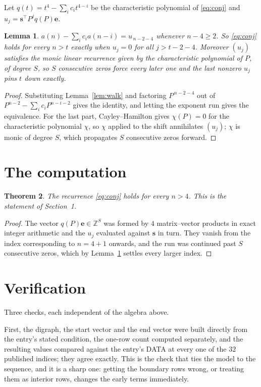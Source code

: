 \documentclass[11pt,a4paper]{article}
\theoremstyle{plain}
\newtheorem{theorem}{Theorem}
\newtheorem{lemma}[theorem]{Lemma}
\theoremstyle{definition}
\begin{document}
Let $q(t)=t^{4}-\sum_i c_i t^{4-i}$ be the characteristic polynomial of
\eqref{eq:conj} and $u_j=\mathbf{s}^{\!\top}P^{j}q(P)\mathbf{e}$.

\begin{lemma}\label{lem:crit}
$a(n)-\sum_i c_i a(n-i)=u_{\,n-2-4}$ whenever $n-4\ge2$. So \eqref{eq:conj}
holds for every $n>t$ exactly when $u_j=0$ for all $j>t-2-4$. Moreover $(u_j)$
satisfies the monic linear recurrence given by the characteristic polynomial of $P$, of
degree $S$, so $S$ consecutive zeros force every later one and the last nonzero $u_j$ pins
$t$ down exactly.
\end{lemma}

\begin{proof}
Substituting Lemma~\ref{lem:walk} and factoring $P^{\,n-2-4}$ out of
$P^{n-2}-\sum_i c_i P^{n-i-2}$ gives the identity, and letting the exponent run gives the
equivalence. For the last part, Cayley--Hamilton gives $\chi(P)=0$ for the characteristic
polynomial $\chi$, so $\chi$ applied to the shift annihilates $(u_j)$; $\chi$ is monic of
degree $S$, which propagates $S$ consecutive zeros forward.
\end{proof}

\section{The computation}

\begin{theorem}
The recurrence \eqref{eq:conj} holds for every $n>4$. This is the statement of
Section~1.
\end{theorem}

\begin{proof}
The vector $q(P)\mathbf{e}\in\mathbb{Z}^{S}$ was formed by $4$ matrix--vector
products in exact integer arithmetic and the $u_j$ evaluated against $\mathbf{s}$ in turn.
They vanish from the index corresponding to $n=4+1$ onwards, and the run was continued
past $S$ consecutive zeros, which by Lemma~\ref{lem:crit} settles every larger index.
\end{proof}

\section{Verification}

Three checks, each independent of the algebra above.

First, the digraph, the start vector and the end vector were built directly from the
entry's stated condition, the one-row count computed separately, and the resulting values
compared against the entry's DATA at every one of the $32$ published indices; they
agree exactly. This is the check that ties the model to the sequence, and it is a sharp one:
getting the boundary rows wrong, or treating them as interior rows, changes the early terms
immediately.
\end{document}
